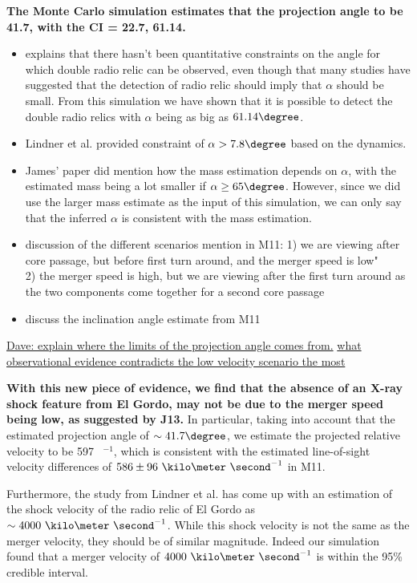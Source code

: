 \textbf{The Monte Carlo simulation estimates that the projection angle to
be 41.7\degree, with the CI = 22.7\degree, 61.14\degree.} 
\begin{itemize}
\item explains that there hasn't been quantitative constraints on the angle
for which double radio relic can be observed, even though that many studies
have suggested that the detection of radio relic should imply that $\alpha$
should be small. From this simulation we have shown that it is possible to detect
the double radio relics with $\alpha$ being as big as $61.14\degree$. 

\item Lindner et al. provided constraint of $\alpha > 7.8 \degree$ based 
on the dynamics.
\item James' paper did mention how the mass estimation depends on $\alpha$,
with the estimated mass being a lot smaller if $\alpha \ge 65\degree$. 
However, since we did use the larger mass estimate as the input of this
simulation, we can only say that the inferred $\alpha$ is consistent with
the mass estimation. 
\item discussion of the different scenarios mention in M11:
1) we are viewing after core passage, but before first turn around, and
the merger speed is low"\\
2) the merger speed is high, but we are viewing after the first turn
around as the two components come together for a second core passage
\item discuss the inclination angle estimate from M11
\end{itemize}
\underline{Dave: explain where the limits of the projection angle comes
from.} 
\underline{what observational evidence contradicts the low velocity
scenario the most} 

\textbf{With this new piece of evidence, we find that the absence of an
X-ray shock feature from El Gordo, may not be due to the merger speed being
low, as suggested by J13.} 
In particular, taking into account that the estimated projection angle of 
$\sim 41.7\degree$, we estimate the projected relative velocity to be 597 \kilo \meter~\second$^{-1}$, which is consistent with the estimated line-of-sight velocity differences of $586 \pm  96~\kilo \meter ~\second^{-1}$ in M11. 

Furthermore, the study from \cite{L13} Lindner et al. has come up
with an estimation of the shock velocity of the radio relic of El Gordo as 
$\sim 4000~\kilo \meter~\second^{-1}$. While this shock velocity is not the
same as the merger velocity, they should be of similar magnitude. Indeed
our simulation found that a merger velocity of $4000~\kilo
\meter~\second^{-1}$ is within the 95\% credible interval. 
